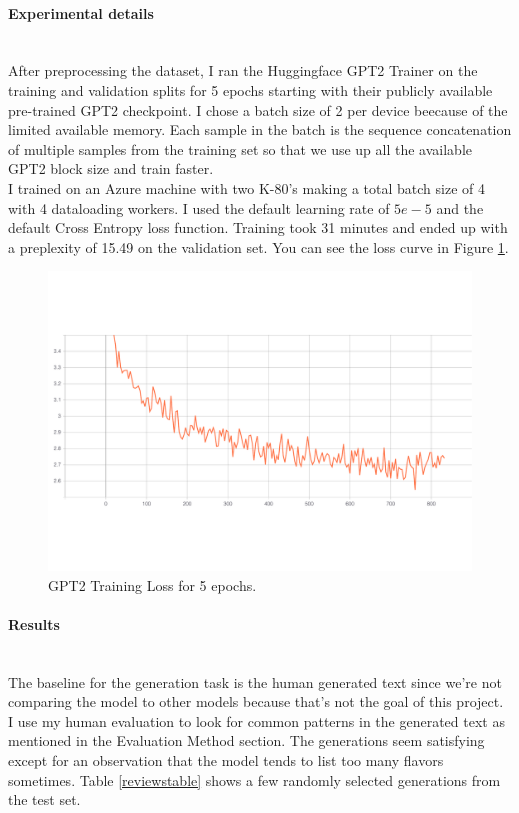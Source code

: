 \documentclass{article}
\begin{document}
\paragraph{Experimental details}$ $
\\ After preprocessing the dataset, I ran the Huggingface GPT2 Trainer on the training and validation splits for 5 epochs starting with their publicly available pre-trained GPT2 checkpoint. I chose a batch size of 2 per device beecause of the limited available memory. Each sample in the batch is the sequence concatenation of multiple samples from the training set so that we use up all the available GPT2 block size and train faster. 
\\ I trained on an Azure machine with two K-80's making a total batch size of 4 with 4 dataloading workers. I used the default learning rate of $5e-5$ and the default Cross Entropy loss function. Training took 31 minutes and ended up with a preplexity of 15.49 on the validation set.  You can see the loss curve in Figure \ref{Fig:get_finetune_loss_fig}.

\begin{figure}[tb]
 \centering
\includegraphics[width=0.7\columnwidth]{finetune_condgen_train_loss.pdf}
\vspace{-12mm}
\caption{GPT2 Training Loss for 5 epochs.}
\label{Fig:get_finetune_loss_fig}
\vspace{-3mm}
\end{figure}

\paragraph{Results}$ $
\\The baseline for the generation task is the human generated text since we're not comparing the model to other models because that's not the goal of this project. I use my human evaluation to look for common patterns in the generated text as mentioned in the Evaluation Method section.  The generations seem satisfying except for an observation that the model tends to list too many flavors sometimes. Table \ref{reviewstable} shows a few randomly selected generations from the test set.
\end{document}
